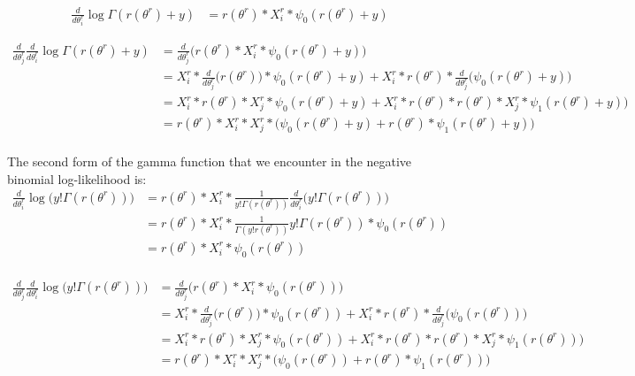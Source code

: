 \documentclass[bibliography=totoc,10pt]{scrartcl}
\begin{document}
\begin{equation}
\begin{split}
\frac{d}{d \theta^r_i} \log \Gamma(r(\theta^r)+y) &= r(\theta^r) * X^r_{i} * \psi_0(r(\theta^r)+y) 
\end{split}
\end{equation}

\begin{equation}
\begin{split}
\frac{d}{d \theta^r_j} \frac{d}{d \theta^r_i} \log \Gamma(r(\theta^r)+y) &= \frac{d}{d \theta^r_j} \bigg( r(\theta^r) * X^r_{i} * \psi_0(r(\theta^r)+y) \bigg) \\
&= X^r_{i} * \frac{d}{d \theta^r_j} \bigg( r(\theta^r)  \bigg)* \psi_0(r(\theta^r)+y) + X^r_{i} * r(\theta^r)  *  \frac{d}{d \theta^r_j} \bigg(  \psi_0(r(\theta^r)+y) \bigg)   \\
&= X^r_{i} * r(\theta^r) * X^r_{j} * \psi_0(r(\theta^r)+y) + X^r_{i} * r(\theta^r)  * r(\theta^r) * X^r_{j} *  \psi_1(r(\theta^r)+y) \bigg)   \\
&= r(\theta^r) * X^r_{i} * X^r_{j} * \bigg( \psi_0(r(\theta^r)+y) + r(\theta^r) *  \psi_1(r(\theta^r)+y) \bigg)   \\
\end{split}
\end{equation}

The second form of the gamma function that we encounter in the negative binomial log-likelihood is:
\begin{equation}
\begin{split}
\frac{d}{d \theta^r_i} \log \bigg(y! \Gamma(r(\theta^r))\bigg) &= r(\theta^r) * X^r_{i} * \frac{1}{y! \Gamma(r(\theta^r))} \frac{d}{d \theta^r_i} \bigg(y! \Gamma(r(\theta^r))\bigg) \\
&= r(\theta^r) * X^r_{i} * \frac{1}{\Gamma(y! r(\theta^r))}y! \Gamma(r(\theta^r))* \psi_0(r(\theta^r))  \\
&= r(\theta^r) * X^r_{i} * \psi_0(r(\theta^r))  \\
\end{split}
\end{equation}

\begin{equation}
\begin{split}
\frac{d}{d \theta^r_j} \frac{d}{d \theta^r_i}  \log \bigg(y! \Gamma(r(\theta^r))\bigg) &= \frac{d}{d \theta^r_j} \bigg( r(\theta^r) * X^r_{i} * \psi_0(r(\theta^r)) \bigg) \\
&= X^r_{i} * \frac{d}{d \theta^r_j} \bigg( r(\theta^r)  \bigg)* \psi_0(r(\theta^r)) + X^r_{i} * r(\theta^r)  *  \frac{d}{d \theta^r_j} \bigg(  \psi_0(r(\theta^r)) \bigg)   \\
&= X^r_{i} * r(\theta^r) * X^r_{j} * \psi_0(r(\theta^r)) + X^r_{i} * r(\theta^r)  * r(\theta^r) * X^r_{j} *  \psi_1(r(\theta^r)) \bigg)   \\
&= r(\theta^r) * X^r_{i} * X^r_{j} * \bigg( \psi_0(r(\theta^r)) + r(\theta^r) *  \psi_1(r(\theta^r)) \bigg)   \\
\end{split}
\end{equation}
\end{document}
